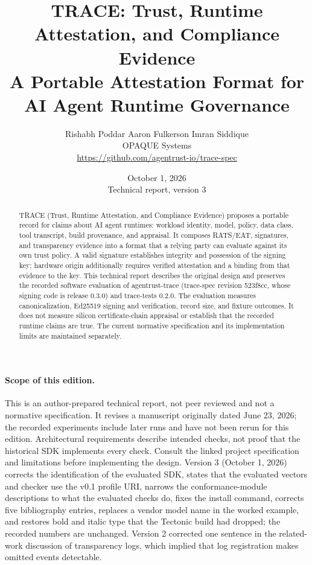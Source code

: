 \documentclass[10pt,letterpaper]{article}
\title{\textbf{TRACE: Trust, Runtime Attestation, and Compliance Evidence}\\
  \large A Portable Attestation Format for AI Agent Runtime Governance}
\author{
  Rishabh Poddar \quad Aaron Fulkerson \quad Imran Siddique \\
  OPAQUE Systems \\[4pt]
  \normalsize \url{https://github.com/agentrust-io/trace-spec}
}
\date{October 1, 2026 \\ \small Technical report, version 3}
\begin{document}
\maketitle

\begin{abstract}
TRACE (Trust, Runtime Attestation, and Compliance Evidence) proposes a
portable record for claims about AI agent runtimes: workload identity, model,
policy, data class, tool transcript, build provenance, and appraisal. It composes
RATS/EAT, signatures, and transparency evidence into a format that a relying party
can evaluate against its own trust policy. A valid signature establishes integrity
and possession of the signing key; hardware origin additionally requires verified
attestation and a binding from that evidence to the key. This technical report
describes the original design and preserves the recorded software evaluation of
agentrust-trace (trace-spec revision 523f8cc, whose signing code is release
0.3.0) and trace-tests 0.2.0. The evaluation measures
canonicalization, Ed25519 signing and verification, record size, and fixture
outcomes. It does not measure silicon certificate-chain appraisal or establish
that the recorded runtime claims are true. The current normative specification
and its implementation limits are maintained separately.
\end{abstract}

\paragraph{Scope of this edition.}
This is an author-prepared technical report, not peer reviewed and not a
normative specification. It revises a manuscript originally dated June 23, 2026;
the recorded experiments include later runs and have not been rerun for this
edition. Architectural requirements describe intended checks, not proof that
the historical SDK implements every check. Consult the linked project
specification and limitations before implementing the design.
Version 3 (October 1, 2026) corrects the identification of the evaluated SDK, states that the
evaluated vectors and checker use the v0.1 profile URI, narrows the
conformance-module descriptions to what the evaluated checks do, fixes the
install command, corrects five bibliography entries, replaces a vendor
model name in the worked example, and restores bold and italic type that the
Tectonic build had dropped; the recorded numbers are unchanged. Version
2 corrected one sentence in the related-work discussion
of transparency logs, which implied that log registration makes omitted events
detectable.

\tableofcontents
\newpage














\end{document}
